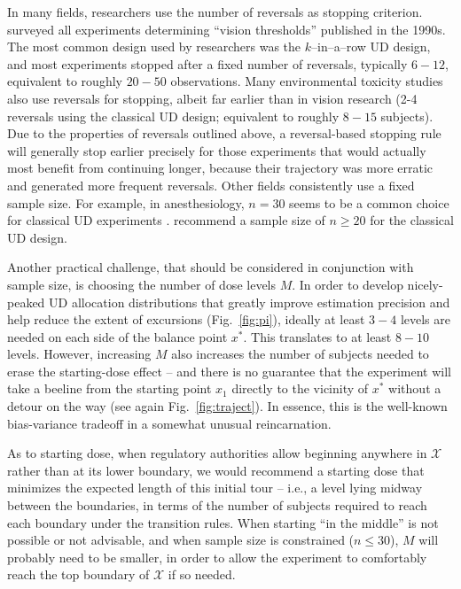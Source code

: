 In many fields, researchers use the number of reversals  as stopping criterion. \cite{Garc:Pere:Forc:1998} surveyed all experiments determining ``vision thresholds'' published in the 1990s. The most common design used by researchers was the $k$--in--a--row UD design, and most experiments stopped after a fixed number of reversals, typically $6-12$, equivalent to roughly $20-50$ observations. Many environmental toxicity studies also use reversals for stopping, albeit far earlier than in vision research (2-4 reversals using the classical UD design; equivalent to roughly $8-15$ subjects). Due to the properties of reversals outlined above, a reversal-based stopping rule will generally stop earlier precisely for those experiments that would actually most benefit from continuing longer, because their trajectory was more erratic and generated more frequent reversals. Other fields consistently use a fixed sample size. For example, in anesthesiology, $n=30$ seems to be a common choice for classical UD experiments \citep{Capo:Parp:Lyon:Colu:Cell:Mini:2001,Camo:Capo:Lyon:Colu:Epid:2004}. \cite{Pace:styl:tutor:2007} recommend a sample size of $n\geq 20$ for the classical UD design.

Another practical challenge, that should be considered in conjunction with sample size, is choosing the number of dose levels $M$. In order to develop nicely-peaked UD allocation distributions that greatly improve estimation precision and help reduce the extent of excursions (Fig.~\ref{fig:pi}), ideally at least $3-4$ levels are needed on each side of the balance point $x^*$. This translates to at least $8-10$ levels. However, increasing $M$ also increases the number of subjects needed to erase the starting-dose effect -- and there is no guarantee that the experiment will take a beeline from the starting point $x_1$ directly to the vicinity of $x^*$ without a detour on the way (see again Fig.~\ref{fig:traject}).  In essence, this is the well-known bias-variance tradeoff in a somewhat unusual reincarnation.

As to starting dose, when regulatory authorities allow beginning anywhere in $\mathcal{X}$ rather than at its lower boundary, we would recommend a starting dose that minimizes the expected length of this initial tour -- i.e., a level lying midway between the boundaries, in terms of the number of subjects required to reach each boundary under the transition rules. When starting ``in the middle'' is not possible or not advisable, and when sample size is constrained ($n\leq 30$), $M$ will probably need to be smaller, in order to allow the experiment to comfortably reach the top boundary of $\mathcal{X}$ if so needed.

